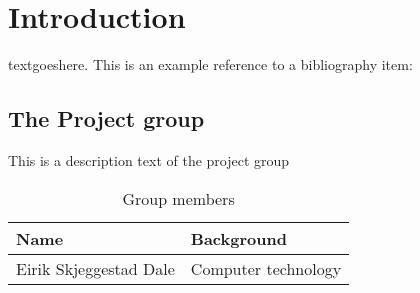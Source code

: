 \chapter{Introduction}
\label{chap:introduction}
textgoeshere. This is an example reference to a bibliography item: \cite{eksempel-bib-item}
\section{The Project group}
This is a description text of the project group
\begin{table}
	\begin{center}
		\begin{tabular}{|p{4cm}|p{7cm}|}   
			\hline      
			\bf{Name} & \bf{Background} \\ 
			\hline
			Eirik Skjeggestad Dale & Computer technology\\     
			\hline
		 \end{tabular}
	\end{center}
	\caption{Group members}
	\label{tab:groupmembers}
\end{table}